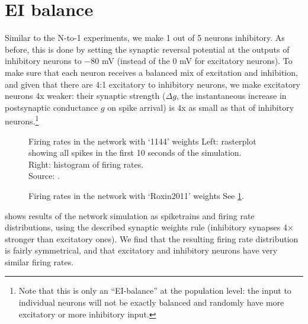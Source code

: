 \section{EI balance}

Similar to the N-to-1 experiments, we make 1 out of 5 neurons inhibitory.
As before, this is done by setting the synaptic reversal potential at the outputs of inhibitory neurons to $-80$ mV (instead of the $0$ mV for excitatory neurons).
To make sure that each neuron receives a balanced mix of excitation and inhibition, and given that there are 4:1 excitatory to inhibitory neurons, we make excitatory neurons 4x weaker: their synaptic strength ($Δg$, the instantaneous increase in postsynaptic conductance $g$ on spike arrival) is 4x as small as that of inhibitory neurons.\footnote{
    Note that this is only an ``EI-balance'' at the population level: the input to individual neurons will not be exactly balanced and randomly have more excitatory or more inhibitory input.
}

\begin{figure}
    \captionn
        {Firing rates in the network with `1144' weights}
        {Left: rasterplot showing all spikes in the first 10 seconds of the simulation.\\
        Right: histogram of firing rates.\\
        Source: .}
    \label{fig:1144-weights}
\end{figure}

\begin{figure}
    \captionn
        {Firing rates in the network with `Roxin2011' weights}
        {See \cref{fig:1144-weights}.}
    \label{fig:roxin-weights}
\end{figure}

 shows results of the network simulation as spiketrains and firing rate distributions, using the described synaptic weights rule (inhibitory synapses 4× stronger than excitatory ones). We find that the resulting firing rate distribution is fairly symmetrical, and that excitatory and inhibitory neurons have very similar firing rates.

